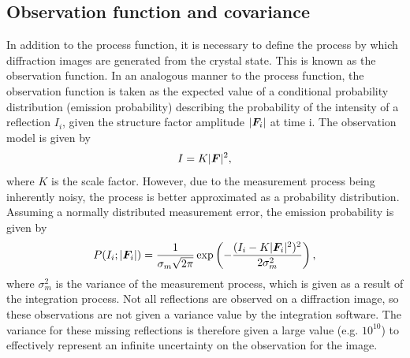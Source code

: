 \subsection{Observation function and covariance}
\label{sub:Observation Function and covariance}
In addition to the process function, it is necessary to define the process by which diffraction images are generated from the crystal state.
This is known as the observation function.
In an analogous manner to the process function, the observation function is taken as the expected value of a conditional probability distribution (emission probability) describing the probability of the intensity of a reflection $I_i$, given the structure factor amplitude $|\boldsymbol{F}_i|$ at time i.
The observation model is given by \cite{otwinowski2003multiparametric}
\begin{equation}
    I = K |\boldsymbol{F}|^2,
    \label{eq:Observation Model}
\end{equation}
where $K$ is the scale factor.
However, due to the measurement process being inherently noisy, the process is better approximated as a probability distribution.
Assuming a normally distributed measurement error, the emission probability is given by
\begin{equation}
    P(I_i ; |\boldsymbol{F}_i|) = \frac{1}{\sigma_m \sqrt{2 \pi}} \exp \left(-\frac{(I_i - K|\boldsymbol{F}_i|^2)^2}{2 \sigma_m^2}\right),
\end{equation}
where $\sigma_m^2$ is the variance of the measurement process, which is given as a result of the integration process.
Not all reflections are observed on a diffraction image, so these observations are not given a variance value by the integration software.
The variance for these missing reflections is therefore given a large value (e.g. $10^{10}$) to effectively represent an infinite uncertainty on the observation for the image.


